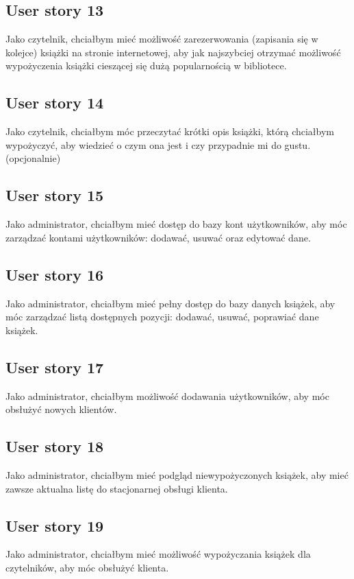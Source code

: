 \documentclass[a4paper]{article}
\begin{document}
\subsection{User story 13}
Jako czytelnik, chciałbym mieć możliwość zarezerwowania (zapisania się w kolejce) książki na stronie internetowej, aby jak najszybciej otrzymać możliwość wypożyczenia książki cieszącej się dużą popularnością w bibliotece.

\subsection{User story 14}
Jako czytelnik, chciałbym móc przeczytać krótki opis książki, którą chciałbym wypożyczyć, aby wiedzieć o czym ona jest i czy przypadnie mi do gustu.(opcjonalnie)

\subsection{User story 15}
Jako administrator, chciałbym mieć dostęp do bazy kont użytkowników, aby móc zarządzać kontami użytkowników: dodawać, usuwać oraz edytować dane.

\subsection{User story 16}
Jako administrator, chciałbym mieć pełny dostęp do bazy danych książek, aby móc zarządzać listą dostępnych pozycji: dodawać, usuwać, poprawiać dane książek.

\subsection{User story 17}
Jako administrator, chciałbym możliwość dodawania użytkowników, aby móc obsłużyć nowych klientów.

\subsection{User story 18}
Jako administrator, chciałbym mieć podgląd niewypożyczonych książek, aby mieć zawsze aktualna listę do stacjonarnej obsługi klienta.

\subsection{User story 19}
Jako administrator, chciałbym mieć możliwość wypożyczania książek dla czytelników, aby móc obsłużyć klienta.
\end{document}
